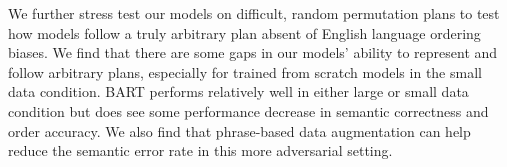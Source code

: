 We further stress test our models on difficult, random permutation plans to
test how models follow a truly arbitrary plan absent of English language
ordering biases. We find that there are some gaps in our models' ability to
represent and follow arbitrary plans, especially for trained from scratch
models in the small data condition. BART performs relatively well in either
large or small data condition but does see some performance decrease in
semantic correctness and order accuracy. We also find that phrase-based data
augmentation can help reduce the semantic error rate in this more adversarial
setting.
